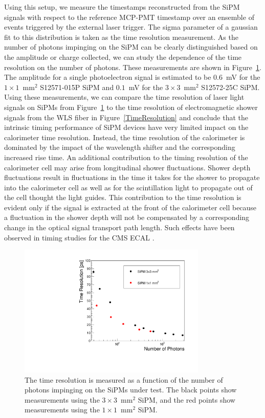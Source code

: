 Using this setup, we measure the timestamps reconstructed from the SiPM signals
with respect to the reference MCP-PMT timestamp over an ensemble of events
triggered by the external laser trigger. The sigma parameter of a gaussian fit
to this distribution is taken as the time resolution measurement.
As the number of photons impinging on the SiPM can be clearly distinguished 
based on the amplitude or charge collected, we can study the dependence of the 
time resolution on the number of photons. These measurements are shown in 
Figure~\ref{fig:TimeResolutionVsNPhotons}. The amplitude for a single
photoelectron signal is estimated to be $0.6$~mV for the $1\times1$~$\mathrm{mm}^{2}$ 
S12571-015P SiPM and $0.1$~mV for 
the $3\times 3$~$\mathrm{mm}^{2}$ S12572-25C SiPM. Using these 
measurements, we can compare the time resolution of laser light signals on
SiPMs from Figure~\ref{fig:TimeResolutionVsNPhotons} to the time resolution
of electromagnetic shower signals from the WLS fiber in Figure~\ref{TimeResolution}
and conclude that the intrinsic timing performance of SiPM devices 
have very limited impact on the calorimeter time resolution.
Instead, the time resolution of the calorimeter is dominated by the 
impact of the wavelength shifter and the corresponding increased rise time.
An additional contribution to the timing resolution of the calorimeter cell may
arise from longitudinal shower fluctuations. Shower depth fluctuations result in
fluctuations in the time it takes for the shower to propagate into the
calorimeter cell as well as for the scintillation light to propagate out of the
cell thought the light guides. This contribution to the time resolution
is evident only if the signal is extracted at the front of the calorimeter
cell because a fluctuation in the shower depth will not be 
compensated by a corresponding change in the optical signal 
transport path length. Such effects have been observed in
timing studies for the CMS ECAL \cite{ecalupgrade}.

\begin{figure}[htbp] 
\centering
\includegraphics[width=0.8\textwidth]{figures/TimeResolutionVsNPhotons.pdf}
\caption{ The time resolution is measured as a function of the number of photons 
impinging on the SiPMs under test. The black points show measurements using the
$3\times3$~$\mathrm{mm}^{2}$ SiPM, and the red points show measurements
using the $1\times1$~$\mathrm{mm}^{2}$ SiPM. \label{fig:TimeResolutionVsNPhotons}
} 
\end{figure} 


